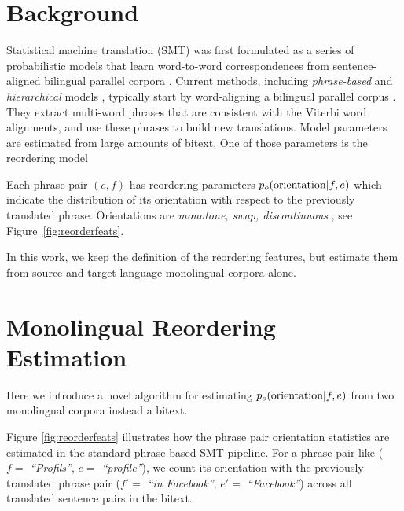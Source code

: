 \documentclass[11pt,letterpaper]{article}
\newcommand{\mnote}[1]{\marginpar{%
  \vskip-\baselineskip
  \raggedright\footnotesize
  \itshape\hrule\smallskip\tiny{#1}\par\smallskip\hrule}}
\newcommand{\mtodo}[1]{\mnote{\textcolor{red}{#1}}}
\newcommand{\figref}[1]{Figure~\ref{#1}}
\newcommand{\emq}[1]{\emph{``#1''}}
\begin{document}
\section{Background} \label{sect:bckg}


Statistical machine translation (SMT) was first formulated as a series of probabilistic models that learn word-to-word correspondences from sentence-aligned bilingual parallel corpora \cite{Brown:1993}.  \nocite{Brown1988}
%
Current methods, including {\em phrase-based} \cite{Och:2002,Koehn:2003} and {\em hierarchical} models \cite{Chiang:2005}, typically start by word-aligning a bilingual parallel corpus \cite{Och2003}.  They extract multi-word phrases that are consistent with the Viterbi word alignments, and use these phrases to build new translations.  Model parameters are estimated from large amounts of bitext.  One of those parameters is the reordering model

Each phrase pair $(e, f)$ has reordering parameters $p_o(\textnormal{orientation}|f,e)$ which indicate the distribution of its orientation with respect to the previously translated phrase. Orientations are {\it monotone, swap, discontinuous} \cite{tillman:2004:HLTNAACL,Kumar2004,Koehn-EtAl:2005:IWSLT}, see \figref{fig:reorderfeats}. 

In this work, we keep the definition of the reordering features, but estimate them from source and target language monolingual corpora alone. %



\section{Monolingual Reordering Estimation} \label{sect:order}

Here we introduce a novel algorithm for estimating $p_o(\textnormal{orientation}|f,e)$ from two monolingual corpora instead a bitext.

Figure \ref{fig:reorderfeats} illustrates how the phrase pair orientation statistics are estimated in the standard phrase-based SMT pipeline.  For a phrase pair like ($f =$ \emq{Profils}, $e =$ \emq{profile}), we count its orientation with the previously translated phrase pair ($f' =$ \emq{in Facebook}, $e' =$ \emq{Facebook}) across all translated sentence pairs in the bitext.  
\end{document}

